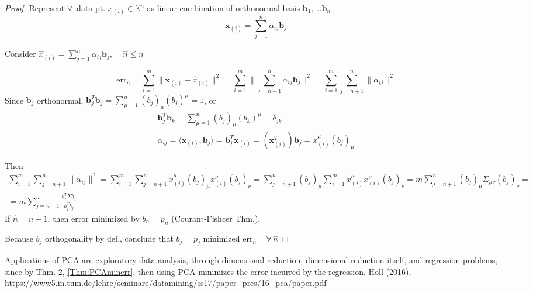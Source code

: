 \documentclass[10pt]{amsart}
\begin{document}
\begin{multicols*}{2}
\begin{proof}
Represent $\forall \, $ data pt. $x_{(i)} \in \mathbb{K}^n$ as linear combination of orthonormal basis $\mathbf{b}_1 , \dots \mathbf{b}_n$  
\[
\mathbf{x}_{(i)} = \sum_{j=1}^n \alpha_{ij} \mathbf{b}_j
\]

Consider $\widehat{x}_{(i)} = \sum_{j=1}^{\widehat{n}} \alpha_{ij}\mathbf{b}_j , \quad \, \widehat{n} \leq n $

\begin{equation}
\text{err}_{\widehat{n}} = \sum_{i=1}^m \|  \mathbf{x}_{(i)} - \widehat{x}_{(i)} \|^2 = \sum_{i=1}^m \| \sum_{j=\widehat{n}+1}^n \alpha_{ij} \mathbf{b}_j \|^2 = \sum_{i=1}^m \sum_{ j = \widehat{n}+1}^n \| \alpha_{ij} \|^2 
\end{equation}
Since $\mathbf{b}_j$ orthonormal, $\mathbf{b}_j^T \mathbf{b}_j = \sum_{\mu = 1}^n (b_j)_{\mu}(b_j)^{\mu} = 1$, or 
\[
\begin{gathered}
\mathbf{b}_j^T \mathbf{b}_k =\sum_{\mu = 1}^n (b_j)_{\mu} (b_k)^{\mu} = \delta_{jk} \\
	\alpha_{ij} = \langle \mathbf{x}_{(i)} , \mathbf{b}_j \rangle = \mathbf{b}_j^T \mathbf{x}_{(i)} = (\mathbf{x}_{(i)}^T ) \mathbf{b}_j = x_{(i)}^{\mu} (b_j)_{\mu} 
\end{gathered}
\]

Then
\[
\begin{gathered}
\sum_{i=1}^m \sum_{j= \widehat{n}+1}^n \| \alpha_{ij} \|^2 = \sum_{i=1}^m \sum_{j =\widehat{n}+1}^n x^{\mu}_{(i)} (b_j)_{\mu} x^{\nu}_{(i)} (b_j)_{\nu} = \sum_{j=\widehat{n}+1}^n (b_j)_{\mu} \sum_{i=1}^m x^{\mu}_{(i)} x^{\nu}_{(i)} (b_j)_{\nu} = m\sum_{j=\widehat{n}+1}^n (b_j)_{\mu} \Sigma_{\mu \nu} (b_j)_{\nu} = \\
= m \sum_{j=\widehat{n}+1}^n \frac{b_j^T \Sigma b_j}{ b_j^T b_j }
\end{gathered}
\]
If $\widehat{n} = n-1$, then error minimized by $b_n = p_n $ (Courant-Fishcer Thm.).  

Because $b_j$ orthogonality by def., conclude that $b_j=p_j$ minimized $\text{err}_{\widehat{n}}  \quad \, \forall \, \widehat{n}$  
\end{proof}


Applications of PCA are exploratory data analysis, through dimensional reduction, dimensional reduction itself, and regression problems, since by Thm. 2, \ref{Thm:PCAminerr}, then using PCA minimizes the error incurred by the regression. Holl (2016), \url{https://www5.in.tum.de/lehre/seminare/datamining/ss17/paper_pres/16_pca/paper.pdf}





\end{multicols*}
\end{document}
